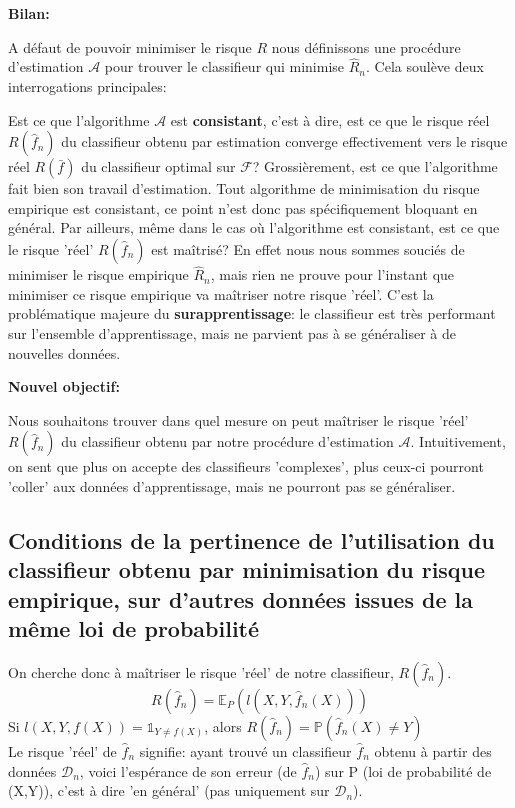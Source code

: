 \documentclass[a4paper]{article}
\theoremstyle{plain}
\begin{document}
\textbf{Bilan:}

A défaut de pouvoir minimiser le risque $R$ nous définissons une procédure d'estimation $\mathcal{A}$ pour trouver le classifieur qui minimise $\hat R_n$. Cela soulève deux interrogations principales: 
\begin{outline}

\1 Est ce que l'algorithme $\mathcal{A}$ est \textbf{consistant}, c'est à dire, est ce que le risque réel  $R(\hat f_n)$ du classifieur obtenu par estimation converge effectivement vers le risque réel $R(\bar f)$ du classifieur optimal sur $\mathcal{F}$? Grossièrement, est ce que l'algorithme fait bien son travail d'estimation.
\2 Tout algorithme de minimisation du risque empirique est consistant, ce point n'est donc pas spécifiquement bloquant en général.
\1 Par ailleurs, même dans le cas où l'algorithme est consistant, est ce que le risque 'réel' $R(\hat f_n)$ est maîtrisé? En effet nous nous sommes souciés de minimiser le risque empirique $\hat R_n$, mais rien ne prouve pour l'instant que minimiser ce risque empirique va maîtriser notre risque 'réel'.
\2 C'est la problématique majeure du \textbf{surapprentissage}: le classifieur est très performant sur l'ensemble d'apprentissage, mais ne parvient pas à se généraliser à de nouvelles données.

\end{outline}

\textbf{Nouvel objectif:}

Nous souhaitons trouver dans quel mesure on peut maîtriser le risque 'réel' $R(\hat f_n)$ du classifieur obtenu par notre procédure d'estimation $\mathcal{A}$. Intuitivement, on sent que plus on accepte des classifieurs 'complexes', plus ceux-ci pourront 'coller' aux données d'apprentissage, mais ne pourront pas se généraliser.

\subsection{Conditions de la pertinence de l'utilisation du classifieur obtenu par minimisation du risque empirique, sur d'autres données issues de la même loi de probabilité}


On cherche donc à maîtriser le risque 'réel' de notre classifieur, $R(\hat f_n)$. 
$$R(\hat f_n) = \mathbb{E}_P(l(X,Y,\hat f_n(X)))$$
Si $l(X,Y,f(X))= \mathds{1}_{Y\neq f(X)}$, alors $R(\hat f_n)= \mathbb{P}(\hat f_n(X)\neq Y)$
\\
Le risque 'réel' de $\hat f_n$ signifie: ayant trouvé un classifieur $\hat f_n$ obtenu à partir des données $\mathcal{D}_n$, voici l'espérance de son erreur (de $\hat f_n$) sur P (loi de probabilité de (X,Y)), c'est à dire 'en général' (pas uniquement sur $\mathcal{D}_n$).\\ 
\\
\end{document}
